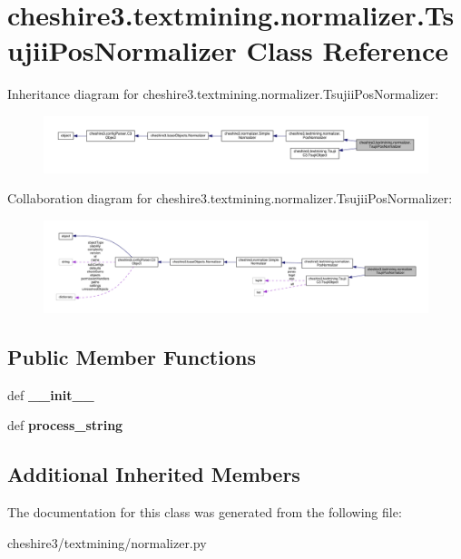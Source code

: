 \hypertarget{classcheshire3_1_1textmining_1_1normalizer_1_1_tsujii_pos_normalizer}{\section{cheshire3.\-textmining.\-normalizer.\-Tsujii\-Pos\-Normalizer Class Reference}
\label{classcheshire3_1_1textmining_1_1normalizer_1_1_tsujii_pos_normalizer}
}


Inheritance diagram for cheshire3.\-textmining.\-normalizer.\-Tsujii\-Pos\-Normalizer\-:
\nopagebreak
\begin{figure}[H]
\begin{center}
\leavevmode
\includegraphics[width=350pt]{classcheshire3_1_1textmining_1_1normalizer_1_1_tsujii_pos_normalizer__inherit__graph}
\end{center}
\end{figure}


Collaboration diagram for cheshire3.\-textmining.\-normalizer.\-Tsujii\-Pos\-Normalizer\-:
\nopagebreak
\begin{figure}[H]
\begin{center}
\leavevmode
\includegraphics[width=350pt]{classcheshire3_1_1textmining_1_1normalizer_1_1_tsujii_pos_normalizer__coll__graph}
\end{center}
\end{figure}
\subsection*{Public Member Functions}
\begin{DoxyCompactItemize}
\item 
\hypertarget{classcheshire3_1_1textmining_1_1normalizer_1_1_tsujii_pos_normalizer_a36ebe16ba7b05830f7d72cfce2b46027}{def {\bfseries \-\_\-\-\_\-init\-\_\-\-\_\-}}\label{classcheshire3_1_1textmining_1_1normalizer_1_1_tsujii_pos_normalizer_a36ebe16ba7b05830f7d72cfce2b46027}

\item 
\hypertarget{classcheshire3_1_1textmining_1_1normalizer_1_1_tsujii_pos_normalizer_a4426c486935ca1d14052d2a750a819e2}{def {\bfseries process\-\_\-string}}\label{classcheshire3_1_1textmining_1_1normalizer_1_1_tsujii_pos_normalizer_a4426c486935ca1d14052d2a750a819e2}

\end{DoxyCompactItemize}
\subsection*{Additional Inherited Members}


The documentation for this class was generated from the following file\-:\begin{DoxyCompactItemize}
\item 
cheshire3/textmining/normalizer.\-py\end{DoxyCompactItemize}
